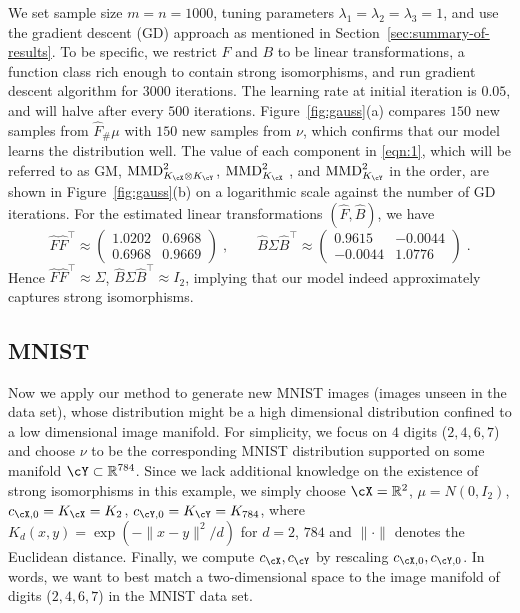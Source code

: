 \documentclass[11pt]{article}
\begin{document}
We set sample size $m = n = 1000$, tuning parameters $\lambda_1 = \lambda_2=\lambda_3 = 1$,  and use the gradient descent (GD) approach as mentioned in Section~\ref{sec:summary-of-results}. To be specific, we restrict $F$ and $B$ to be linear transformations, a function class rich enough to contain strong isomorphisms, and run gradient descent algorithm for $3000$ iterations. 
The learning rate at initial iteration is $0.05$, and will halve after every $500$ iterations. 
Figure~\ref{fig:gauss}(a) compares $150$ new samples from $\widehat{F}_\# \mu$ with $150$ new samples from $\nu$, which confirms that our model learns the distribution well.
The value of each component in \eqref{eqn:1}, which will be referred to as GM, $\mathrm{MMD}_{K_{\cX} \otimes K_{\cY}}^2$, $\mathrm{MMD}_{K_{\cX}}^2$ , and $\mathrm{MMD}_{K_{\cY}}^2$ in the order, are shown in Figure~\ref{fig:gauss}(b) on a logarithmic scale against the number of GD iterations.
For the estimated linear transformations $(\widehat{F}, \widehat{B})$, we have
\[
\widehat{F}\widehat{F}^\top \approx \begin{pmatrix}
    1.0202 & 0.6968 \\
    0.6968 & 0.9669	
\end{pmatrix}\;,
\qquad \widehat{B}\Sigma \widehat{B}^\top \approx
\begin{pmatrix}
	0.9615 & -0.0044 \\
	-0.0044 & 1.0776
\end{pmatrix} \;.
\]
Hence $\widehat{F}\widehat{F}^\top\approx \Sigma$, $\widehat{B}\Sigma \widehat{B}^\top \approx I_2$, implying that our model indeed approximately captures strong isomorphisms.


\subsection{MNIST}

Now we apply our method to generate new MNIST images (images unseen in the data set), whose distribution might be a high dimensional distribution confined to a low dimensional image manifold.
For simplicity, we focus on $4$ digits ($2, 4, 6, 7$) and choose $\nu$ to be the corresponding MNIST distribution supported on some manifold $\cY \subset \mathbb{R}^{784}$.
Since we lack additional knowledge on the existence of strong isomorphisms in this example,
we simply choose
$\cX = \mathbb{R}^2$, $\mu = N(0, I_2)$, $c_{\cX, 0} = K_\cX = K_2$,  $c_{\cY, 0} = K_\cY = K_{784}$,
where $K_d(x, y) = \exp(-\|x-y\|^2/d)$ for $d = 2$, $784$ and
$\|\cdot\|$ denotes the Euclidean distance. Finally, we compute $c_\cX, c_\cY$ by rescaling $c_{\cX, 0}, c_{\cY, 0}$. In words, we want to best match a two-dimensional space to the image manifold of digits ($2, 4, 6, 7$) in the MNIST data set.
\end{document}
